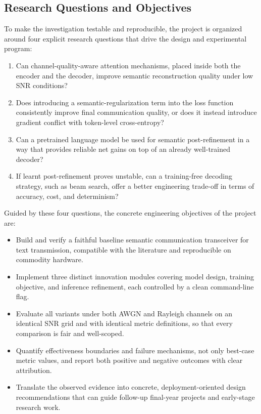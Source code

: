 \subsection{Research Questions and Objectives}

To make the investigation testable and reproducible, the project is organized around four explicit research questions that drive the design and experimental program:

\begin{enumerate}
    \item Can channel-quality-aware attention mechanisms, placed inside both the encoder and the decoder, improve semantic reconstruction quality under low SNR conditions?
    \item Does introducing a semantic-regularization term into the loss function consistently improve final communication quality, or does it instead introduce gradient conflict with token-level cross-entropy?
    \item Can a pretrained language model be used for semantic post-refinement in a way that provides reliable net gains on top of an already well-trained decoder?
    \item If learnt post-refinement proves unstable, can a training-free decoding strategy, such as beam search, offer a better engineering trade-off in terms of accuracy, cost, and determinism?
\end{enumerate}

Guided by these four questions, the concrete engineering objectives of the project are:

\begin{itemize}
    \item Build and verify a faithful baseline semantic communication transceiver for text transmission, compatible with the literature and reproducible on commodity hardware.
    \item Implement three distinct innovation modules covering model design, training objective, and inference refinement, each controlled by a clean command-line flag.
    \item Evaluate all variants under both AWGN and Rayleigh channels on an identical SNR grid and with identical metric definitions, so that every comparison is fair and well-scoped.
    \item Quantify effectiveness boundaries and failure mechanisms, not only best-case metric values, and report both positive and negative outcomes with clear attribution.
    \item Translate the observed evidence into concrete, deployment-oriented design recommendations that can guide follow-up final-year projects and early-stage research work.
\end{itemize}

